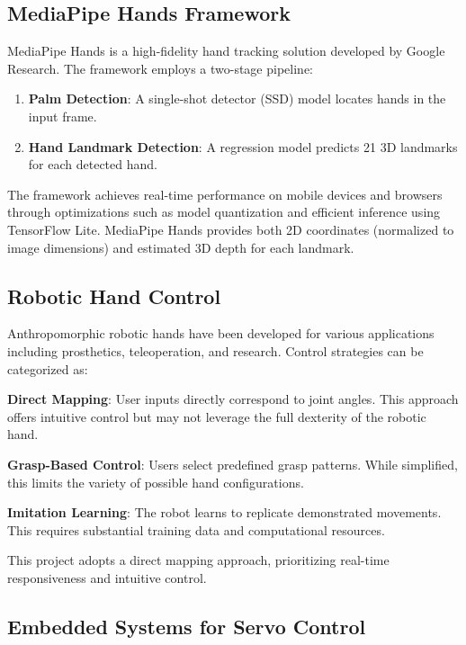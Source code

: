 \documentclass[12pt]{article}
\begin{document}
\subsection{MediaPipe Hands Framework}

MediaPipe Hands is a high-fidelity hand tracking solution developed by Google Research. The framework employs a two-stage pipeline:

\begin{enumerate}
    \item \textbf{Palm Detection}: A single-shot detector (SSD) model locates hands in the input frame.
    \item \textbf{Hand Landmark Detection}: A regression model predicts 21 3D landmarks for each detected hand.
\end{enumerate}

The framework achieves real-time performance on mobile devices and browsers through optimizations such as model quantization and efficient inference using TensorFlow Lite. MediaPipe Hands provides both 2D coordinates (normalized to image dimensions) and estimated 3D depth for each landmark.

\subsection{Robotic Hand Control}

Anthropomorphic robotic hands have been developed for various applications including prosthetics, teleoperation, and research. Control strategies can be categorized as:

\textbf{Direct Mapping}: User inputs directly correspond to joint angles. This approach offers intuitive control but may not leverage the full dexterity of the robotic hand.

\textbf{Grasp-Based Control}: Users select predefined grasp patterns. While simplified, this limits the variety of possible hand configurations.

\textbf{Imitation Learning}: The robot learns to replicate demonstrated movements. This requires substantial training data and computational resources.

This project adopts a direct mapping approach, prioritizing real-time responsiveness and intuitive control.

\subsection{Embedded Systems for Servo Control}
\end{document}
